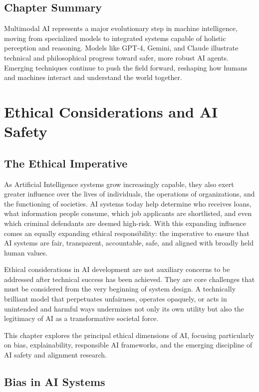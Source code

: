 \documentclass[openany]{book}
\begin{document}
\section{Chapter Summary}

Multimodal AI represents a major evolutionary step in machine intelligence, 
moving from specialized models to integrated systems capable of holistic 
perception and reasoning. Models like GPT-4, Gemini, and Claude illustrate 
technical and philosophical progress toward safer, more robust AI agents. 
Emerging techniques continue to push the field forward, reshaping how humans 
and machines interact and understand the world together.


\chapter{Ethical Considerations and AI Safety}

\section{The Ethical Imperative}

As Artificial Intelligence systems grow increasingly capable, they also exert 
greater influence over the lives of individuals, the operations of 
organizations, and the functioning of societies. AI systems today help 
determine who receives loans, what information people consume, which job 
applicants are shortlisted, and even which criminal defendants are deemed 
high-risk. With this expanding influence comes an equally expanding ethical 
responsibility: the imperative to ensure that AI systems are fair, transparent, 
accountable, safe, and aligned with broadly held human values.

Ethical considerations in AI development are not auxiliary concerns to be 
addressed after technical success has been achieved. They are core challenges 
that must be considered from the very beginning of system design. A technically 
brilliant model that perpetuates unfairness, operates opaquely, or acts in 
unintended and harmful ways undermines not only its own utility but also the 
legitimacy of AI as a transformative societal force.

This chapter explores the principal ethical dimensions of AI, focusing 
particularly on bias, explainability, responsible AI frameworks, and the 
emerging discipline of AI safety and alignment research.

\section{Bias in AI Systems}
\end{document}
